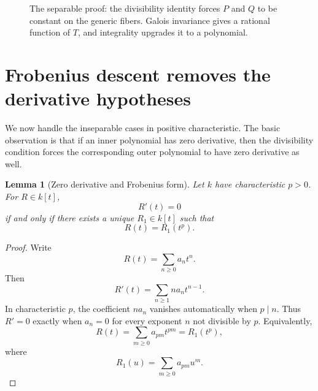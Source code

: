 \documentclass[12pt]{article}
\newtheorem{lemma}[theorem]{Lemma}
\begin{document}
\begin{figure}[htbp]
\centering
{}
\caption{The separable proof: the divisibility identity forces \(P\) and \(Q\) to be constant on the generic fibers.  Galois invariance gives a rational function of \(T\), and integrality upgrades it to a polynomial.}
\end{figure}

\section{Frobenius descent removes the derivative hypotheses}

We now handle the inseparable cases in positive characteristic.  The basic observation is that if an inner polynomial has zero derivative, then the divisibility condition forces the corresponding outer polynomial to have zero derivative as well.

\begin{lemma}[Zero derivative and Frobenius form]\label{lem:zero-derivative}
Let \(k\) have characteristic \(p>0\).  For \(R\in k[t]\),
\[
    R'(t)=0
\]
if and only if there exists a unique \(R_1\in k[t]\) such that
\[
    R(t)=R_1(t^p).
\]
\end{lemma}

\begin{proof}
Write
\[
    R(t)=\sum_{n\geq 0}a_n t^n.
\]
Then
\[
    R'(t)=\sum_{n\geq 1} n a_n t^{n-1}.
\]
In characteristic \(p\), the coefficient \(n a_n\) vanishes automatically when \(p\mid n\).  Thus \(R'=0\) exactly when \(a_n=0\) for every exponent \(n\) not divisible by \(p\).  Equivalently,
\[
    R(t)=\sum_{m\geq 0}a_{pm}t^{pm}=R_1(t^p),
\]
where
\[
    R_1(u)=\sum_{m\geq 0}a_{pm}u^m.
\]
\end{proof}
\end{document}
